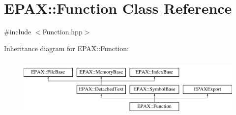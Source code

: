 \hypertarget{class_e_p_a_x_1_1_function}{\section{\-E\-P\-A\-X\-:\-:\-Function \-Class \-Reference}
\label{class_e_p_a_x_1_1_function}
}


{\ttfamily \#include $<$\-Function.\-hpp$>$}

\-Inheritance diagram for \-E\-P\-A\-X\-:\-:\-Function\-:\begin{figure}[H]
\begin{center}
\leavevmode
\includegraphics[height=3.000000cm]{class_e_p_a_x_1_1_function}
\end{center}
\end{figure}
